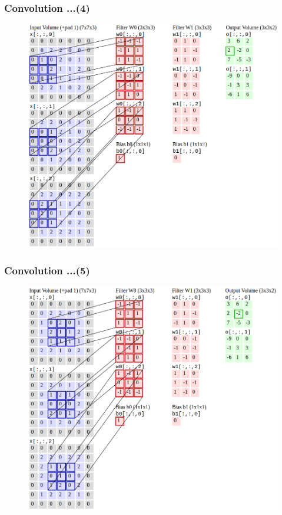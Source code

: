 \documentclass{beamer}
\begin{document}
\begin{frame}
	\frametitle{Convolution ...(4)}
	\begin{figure}
		\includegraphics[scale=0.28]{./figures/edit/conv_06_edit.png}
	\end{figure}
\end{frame}

\begin{frame}
	\frametitle{Convolution ...(5)}
	\begin{figure}	
		\includegraphics[scale=0.28]{./figures/edit/conv_07_edit.png}
	\end{figure}
\end{frame}
\end{document}

